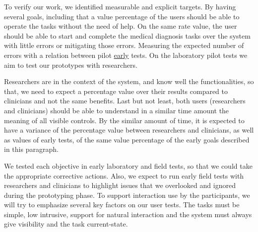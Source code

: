 To verify our work, we identified measurable and explicit targets. By having several goals, including that a value percentage of the users should be able to operate the tasks without the need of help. On the same rate value, the user should be able to start and complete the medical diagnosis tasks over the system with little errors or mitigating those errors. Measuring the expected number of errors with a relation between pilot \hyperlink{https://github.com/MIMBCD-UI/testing-guide-breast/tree/master/samples/test_4}{early} tests. On the laboratory pilot tests we aim to test our prototypes with researchers.

Researchers are in the context of the system, and know well the functionalities, so that, we need to expect a percentage value over their results compared to clinicians and not the same benefits. Last but not least, both users (researchers and clinicians) should be able to understand in a similar time amount the meaning of all visible controls. By the similar amount of time, it is expected to have a variance of the percentage value between researchers and clinicians, as well as values of early tests, of the same value percentage of the early goals described in this paragraph.

We tested each objective in early laboratory and field tests, so that we could take the appropriate corrective actions. Also, we expect to run early field tests with researchers and clinicians to highlight issues that we overlooked and ignored during the prototyping phase. To support interaction use by the participants, we will try to emphasize several key factors on our user tests. The tasks must be simple, low intrusive, support for natural interaction and the system must always give visibility and the task current-state.